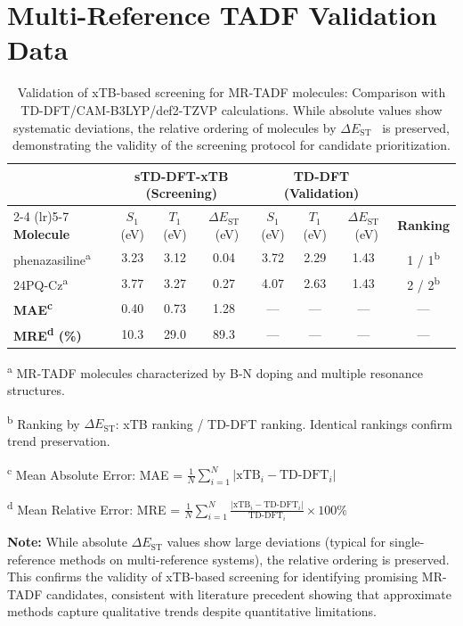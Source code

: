 \documentclass[journal=cmatex,manuscript=suppinfo,
keywords=true]{achemso}
\newcommand{\deltaest}{$\Delta E_{\text{ST}}$}
\begin{document}


\section{Multi-Reference TADF Validation Data}

\begin{table}[H]
\centering
\caption{Validation of xTB-based screening for MR-TADF molecules: Comparison with TD-DFT/CAM-B3LYP/def2-TZVP calculations. While absolute values show systematic deviations, the relative ordering of molecules by \deltaest~ is preserved, demonstrating the validity of the screening protocol for candidate prioritization.}
\label{tab:mr_tadf_validation}
\begin{tabular}{lccccccc}
\hline
\hline
& \multicolumn{3}{c}{\textbf{sTD-DFT-xTB (Screening)}} & \multicolumn{3}{c}{\textbf{TD-DFT (Validation)}} & \\
\cmidrule(lr){2-4} \cmidrule(lr){5-7}
\textbf{Molecule} & $S_1$ (eV) & $T_1$ (eV) & \deltaest~(eV) & $S_1$ (eV) & $T_1$ (eV) & \deltaest~(eV) & \textbf{Ranking} \\
\hline
phenazasiline\textsuperscript{a} & 3.23 & 3.12 & 0.04 & 3.72 & 2.29 & 1.43 & 1 / 1\textsuperscript{b} \\
24PQ-Cz\textsuperscript{a} & 3.77 & 3.27 & 0.27 & 4.07 & 2.63 & 1.43 & 2 / 2\textsuperscript{b} \\
\hline
\textbf{MAE\textsuperscript{c}} & 0.40 & 0.73 & 1.28 & --- & --- & --- & --- \\
\textbf{MRE\textsuperscript{d} (\%)} & 10.3 & 29.0 & 89.3 & --- & --- & --- & --- \\
\hline
\hline
\end{tabular}
\begin{tablenotes}
\small
\item \textsuperscript{a} MR-TADF molecules characterized by B-N doping and multiple resonance structures.
\item \textsuperscript{b} Ranking by \deltaest: xTB ranking / TD-DFT ranking. Identical rankings confirm trend preservation.
\item \textsuperscript{c} Mean Absolute Error: MAE = $\frac{1}{N}\sum_{i=1}^{N}|\mathrm{xTB}_i - \mathrm{TD\text{-}DFT}_i|$
\item \textsuperscript{d} Mean Relative Error: MRE = $\frac{1}{N}\sum_{i=1}^{N}\frac{|\mathrm{xTB}_i - \mathrm{TD\text{-}DFT}_i|}{\mathrm{TD\text{-}DFT}_i} \times 100\%$
\item \textbf{Note:} While absolute $\Delta E_{\text{ST}}$ values show large deviations (typical for single-reference methods on multi-reference systems), the relative ordering is preserved. This confirms the validity of xTB-based screening for identifying promising MR-TADF candidates, consistent with literature precedent showing that approximate methods capture qualitative trends despite quantitative limitations.\cite{Pershin2019,Olivier2022}
\end{tablenotes}
\end{table}
\end{document}
